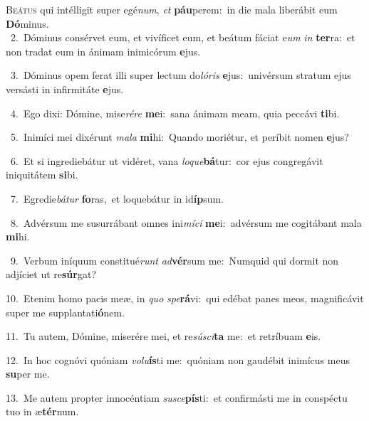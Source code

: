 \lettrine{\initial\textcolor{\initialcolor}{B}}{eátus} qui intélligit super egé\-\textit{num}\-, \textit{et} \textbf{páu}\-perem:~\star in die mala liberábit eum \textbf{Dó}\-minus.\\
{\numbfont\textcolor{\numbcolor}{~2.}}~Dóminus consérvet eum, et vivíficet eum, et beátum fáciat e\textit{um} \textit{in} \textbf{ter}\-ra:~\star et non tradat eum in ánimam inimicórum \textbf{e}\-jus.\par
{\numbfont\textcolor{\numbcolor}{~3.}}~Dóminus opem ferat illi super lectum do\-\textit{ló}\-\textit{ris} \textbf{e}\-jus:~\star univérsum stratum ejus versásti in infirmitáte \textbf{e}\-jus.\par
{\numbfont\textcolor{\numbcolor}{~4.}}~Ego dixi: Dómine, mise\-\textit{ré}\-\textit{re} \textbf{me}\-i:~\star sana ánimam meam, quia peccávi \textbf{ti}\-bi.\par
{\numbfont\textcolor{\numbcolor}{~5.}}~Inimíci mei dixérunt \textit{ma}\-\textit{la} \textbf{mi}\-hi:~\star Quando moriétur, et períbit nomen \textbf{e}\-jus?\par
{\numbfont\textcolor{\numbcolor}{~6.}}~Et si ingrediebátur ut vidéret, vana \textit{lo}\-\textit{que}\textbf{bá}tur:~\star cor ejus congregávit iniquitátem \textbf{si}\-bi.\par
{\numbfont\textcolor{\numbcolor}{~7.}}~Egredie\-\textit{bá}\-\textit{tur} \textbf{fo}\-ras,~\star et loquebátur in id\-\textbf{íp}\-sum.\par
{\numbfont\textcolor{\numbcolor}{~8.}}~Advérsum me susurrábant omnes ini\-\textit{mí}\-\textit{ci} \textbf{me}\-i:~\star advérsum me cogitábant mala \textbf{mi}\-hi.\par
{\numbfont\textcolor{\numbcolor}{~9.}}~Verbum iníquum constitué\textit{runt} \textit{ad}\-\textbf{vér}sum me:~\star Numquid qui dormit non adjíciet ut re\-\textbf{súr}\-gat?\par
{\numbfont\textcolor{\numbcolor}{10.}}~Etenim homo pacis meæ, in \textit{quo} \textit{spe}\-\textbf{rá}vi:~\star qui edébat panes meos, magnificávit super me supplantati\-\textbf{ó}\-nem.\par
{\numbfont\textcolor{\numbcolor}{11.}}~Tu autem, Dómine, miserére mei, et re\-\textit{sú}\-\textit{sci}\textbf{ta} me:~\star et retríbuam \textbf{e}\-is.\par
{\numbfont\textcolor{\numbcolor}{12.}}~In hoc cognóvi quóniam \textit{vo}\-\textit{lu}\textbf{ís}ti me:~\star quóniam non gaudébit inimícus meus \textbf{su}\-per me.\par
{\numbfont\textcolor{\numbcolor}{13.}}~Me autem propter innocéntiam \textit{su}\-\textit{sce}\textbf{pís}ti:~\star et confirmásti me in conspéctu tuo in æ\-\textbf{tér}\-num.\par
